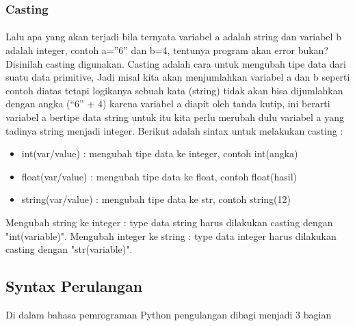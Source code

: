 \documentclass{article}
\begin{document}
\subsubsection{Casting}
\paragraph{}
Lalu apa yang akan terjadi bila ternyata variabel a adalah string dan variabel b adalah integer, contoh a=”6” dan b=4, tentunya program akan error bukan? Disinilah casting digunakan. Casting adalah cara untuk mengubah tipe data dari suatu data primitive, Jadi misal kita akan menjumlahkan variabel a dan b seperti contoh diatas tetapi logikanya sebuah kata (string) tidak akan bisa dijumlahkan dengan angka (“6” + 4) karena variabel a diapit oleh tanda kutip, ini berarti variabel a bertipe data string untuk itu kita perlu merubah dulu variabel a yang tadinya string menjadi integer. Berikut adalah sintax untuk melakukan casting :
\begin{itemize}
	\item int(var/value) : mengubah tipe data ke integer, contoh int(angka)
	\item float(var/value) : mengubah tipe data ke float, contoh float(hasil)
	\item string(var/value) : mengubah tipe data ke str, contoh string(12)
\end{itemize}
Mengubah string ke integer : type data string harus dilakukan casting dengan "int(variable)".
Mengubah integer ke string : type data integer harus dilakukan casting dengan "str(variable)".\\

\subsection{Syntax Perulangan}

\item Di dalam bahasa pemrograman Python pengulangan dibagi menjadi 3 bagian
\end{document}
